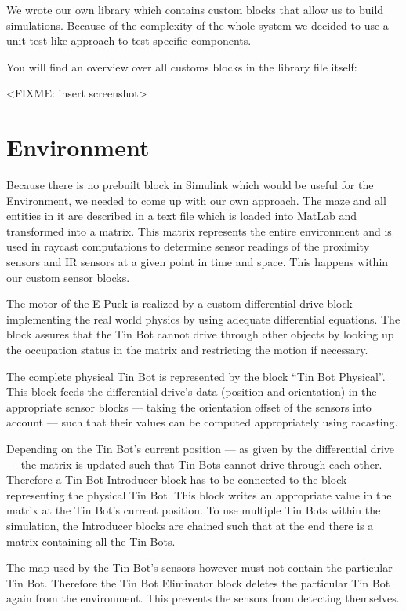 \documentclass[a4paper,parskip,headheight=38pt]{scrartcl} %
\begin{document}
We wrote our own library which contains custom blocks that allow us to build simulations. Because of the complexity of the whole system we decided to use a unit test like approach to test specific components.

You will find an overview over all customs blocks in the library file itself:

<FIXME: insert screenshot>

\section{Environment}
Because there is no prebuilt block in Simulink which would be useful for the Environment, we needed to come up with our own approach. The maze and all entities in it are described in a text file which is loaded into MatLab and transformed into a matrix. This matrix represents the entire environment and is used in raycast computations to determine sensor readings of the proximity sensors and IR sensors at a given point in time and space. This happens within our custom sensor blocks.

The motor of the E-Puck is realized by a custom differential drive block implementing the real world physics by using adequate differential equations. The block assures that the Tin Bot cannot drive through other objects by looking up the occupation status in the matrix and restricting the motion if necessary.

The complete physical Tin Bot is represented by the block \enquote{Tin Bot Physical}. This block feeds the differential drive's data (position and orientation) in the appropriate sensor blocks — taking the orientation offset of the sensors into account — such that their values can be computed appropriately using racasting.

Depending on the Tin Bot's current position — as given by the differential drive — the matrix is updated such that Tin Bots cannot drive through each other. Therefore a Tin Bot Introducer block has to be connected to the block representing the physical Tin Bot. This block writes an appropriate value in the matrix at the Tin Bot's current position. To use multiple Tin Bots within the simulation, the Introducer blocks are chained such that at the end there is a matrix containing all the Tin Bots.

The map used by the Tin Bot's sensors however must not contain the particular Tin Bot. Therefore the Tin Bot Eliminator block deletes the particular Tin Bot again from the environment. This prevents the sensors from detecting themselves.
\end{document}
